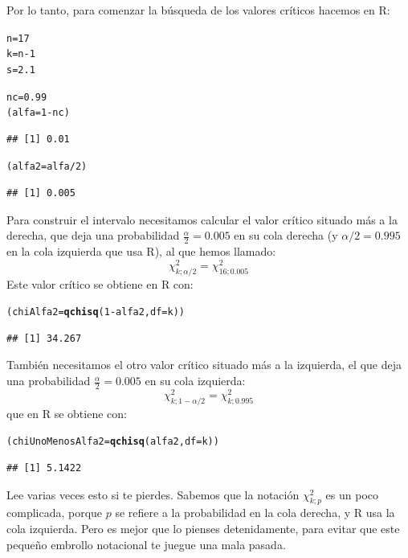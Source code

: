 \documentclass[10pt,a4paper]{article}\usepackage[]{graphicx}\usepackage[]{color}
\makeatletter
\newcommand{\hlnum}[1]{\textcolor[rgb]{0.686,0.059,0.569}{#1}}%
\newcommand{\hlopt}[1]{\textcolor[rgb]{0,0,0}{#1}}%
\newcommand{\hlstd}[1]{\textcolor[rgb]{0.345,0.345,0.345}{#1}}%
\newcommand{\hlkwb}[1]{\textcolor[rgb]{0.69,0.353,0.396}{#1}}%
\newcommand{\hlkwc}[1]{\textcolor[rgb]{0.333,0.667,0.333}{#1}}%
\newcommand{\hlkwd}[1]{\textcolor[rgb]{0.737,0.353,0.396}{\textbf{#1}}}%
\newenvironment{kframe}{%
 \def\at@end@of@kframe{}%
 \ifinner\ifhmode%
  \def\at@end@of@kframe{\end{minipage}}%
  \begin{minipage}{\columnwidth}%
 \fi\fi%
 \def\FrameCommand##1{\hskip\@totalleftmargin \hskip-\fboxsep
 \colorbox{shadecolor}{##1}\hskip-\fboxsep
     \hskip-\linewidth \hskip-\@totalleftmargin \hskip\columnwidth}%
 \MakeFramed {\advance\hsize-\width
   \@totalleftmargin\z@ \linewidth\hsize
   \@setminipage}}%
 {\par\unskip\endMakeFramed%
 \at@end@of@kframe}
\newenvironment{knitrout}{}{} %
\makeatother
\begin{document}
Por lo tanto, para comenzar la búsqueda de los valores críticos hacemos en R:
\begin{knitrout}
\color{fgcolor}\begin{kframe}
\begin{alltt}
\hlstd{n} \hlkwb{=} \hlnum{17}
\hlstd{k} \hlkwb{=} \hlstd{n} \hlopt{-} \hlnum{1}
\hlstd{s} \hlkwb{=} \hlnum{2.1}

\hlstd{nc} \hlkwb{=} \hlnum{0.99}
\hlstd{(alfa} \hlkwb{=} \hlnum{1} \hlopt{-} \hlstd{nc)}
\end{alltt}
\begin{verbatim}
## [1] 0.01
\end{verbatim}
\begin{alltt}
\hlstd{(alfa2} \hlkwb{=} \hlstd{alfa} \hlopt{/}\hlnum{2}\hlstd{)}
\end{alltt}
\begin{verbatim}
## [1] 0.005
\end{verbatim}
\end{kframe}
\end{knitrout}
Para  construir el intervalo necesitamos calcular el valor crítico situado más a la derecha, que deja una probabilidad $\frac{\alpha}{2}=0.005$ en su cola derecha (y $\alpha/2 = 0.995$ en la cola izquierda que usa R), al que hemos llamado:
\[\chi^2_{k;\alpha/2} = \chi^2_{16;0.005}\]
Este valor crítico se obtiene en R con:
\begin{knitrout}
\color{fgcolor}\begin{kframe}
\begin{alltt}
\hlstd{(chiAlfa2} \hlkwb{=} \hlkwd{qchisq}\hlstd{(}\hlnum{1} \hlopt{-} \hlstd{alfa2,} \hlkwc{df}\hlstd{=k))}
\end{alltt}
\begin{verbatim}
## [1] 34.267
\end{verbatim}
\end{kframe}
\end{knitrout}
También necesitamos el otro valor crítico situado más a la izquierda, el que deja una probabilidad $\frac{\alpha}{2}=0.005$ en su cola izquierda:
\[\chi^2_{k;1 - \alpha/2} = \chi^2_{k;0.995}\]
que en R se obtiene con:
\begin{knitrout}
\color{fgcolor}\begin{kframe}
\begin{alltt}
\hlstd{(chiUnoMenosAlfa2} \hlkwb{=} \hlkwd{qchisq}\hlstd{(alfa2,} \hlkwc{df}\hlstd{=k))}
\end{alltt}
\begin{verbatim}
## [1] 5.1422
\end{verbatim}
\end{kframe}
\end{knitrout}
Lee varias veces esto si te pierdes. Sabemos que la notación $\chi^2_{k;p}$ es un poco complicada, porque $p$ se refiere a la probabilidad en la cola derecha, y R usa la cola izquierda. Pero es mejor que lo pienses detenidamente, para evitar que este pequeño embrollo notacional te juegue una mala pasada.
\end{document}
